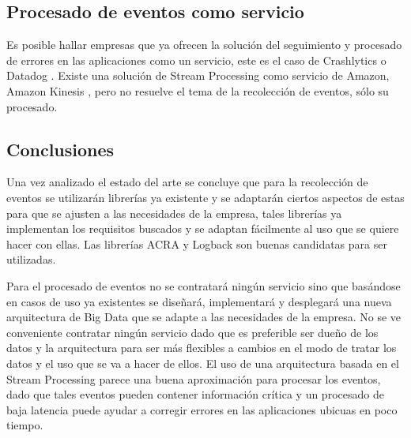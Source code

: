 \subsection{Procesado de eventos como servicio}
Es posible hallar empresas que ya ofrecen la solución del seguimiento y procesado de errores en las aplicaciones como un servicio, este es el caso de Crashlytics \cite{Tfg:crashlytics} o Datadog \cite{Tfg:datadog}. Existe una solución de Stream Processing como servicio de Amazon, Amazon Kinesis \cite{Tfg:kinesis}, pero no resuelve el tema de la recolección de eventos, sólo su procesado.

\subsection{Conclusiones}
Una vez analizado el estado del arte se concluye que para la recolección de eventos se utilizarán librerías ya existente y se adaptarán ciertos aspectos de estas para que se ajusten a las necesidades de la empresa, tales librerías ya implementan los requisitos buscados y se adaptan fácilmente al uso que se quiere hacer con ellas. Las librerías ACRA y Logback son buenas candidatas para ser utilizadas.

Para el procesado de eventos no se contratará ningún servicio sino que basándose en casos de uso ya existentes se diseñará, implementará y desplegará una nueva arquitectura de Big Data que se adapte a las necesidades de la empresa. No se ve conveniente contratar ningún servicio dado que es preferible ser dueño de los datos y la arquitectura para ser más flexibles a cambios en el modo de tratar los datos y el uso que se va a hacer de ellos. El uso de una arquitectura basada en el Stream Processing parece una buena aproximación para procesar los eventos, dado que tales eventos pueden contener información crítica y un procesado de baja latencia puede ayudar a corregir errores en las aplicaciones ubicuas en poco tiempo.



